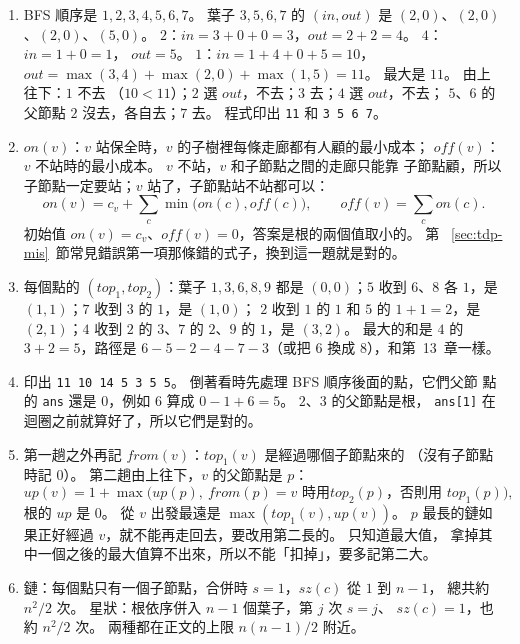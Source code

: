 \begin{enumerate}
\item BFS 順序是 $1, 2, 3, 4, 5, 6, 7$。 葉子 $3, 5, 6, 7$ 的 $(\mathit{in},
\mathit{out})$ 是 $(2, 0)$、$(2, 0)$、$(2, 0)$、$(5, 0)$。 $2$：$\mathit{in} = 3
+ 0 + 0 = 3$，$\mathit{out} = 2 + 2 = 4$。 $4$：$\mathit{in} = 1 + 0 = 1$，
$\mathit{out} = 5$。 $1$：$\mathit{in} = 1 + 4 + 0 + 5 = 10$，$\mathit{out} =
\max(3, 4) + \max(2, 0) + \max(1, 5) = 11$。 最大是 $11$。 由上往下：$1$ 不去
（$10 < 11$）；$2$ 選 $\mathit{out}$，不去；$3$ 去；$4$ 選 $\mathit{out}$，不去；
$5$、$6$ 的父節點 $2$ 沒去，各自去；$7$ 去。 程式印出 \texttt{11} 和
\texttt{3 5 6 7}。

\item $\mathit{on}(v)$：$v$ 站保全時，$v$ 的子樹裡每條走廊都有人顧的最小成本；
$\mathit{off}(v)$：$v$ 不站時的最小成本。 $v$ 不站，$v$ 和子節點之間的走廊只能靠
子節點顧，所以子節點一定要站；$v$ 站了，子節點站不站都可以：
\[
\mathit{on}(v) = c_v + \sum_c \min\bigl(\mathit{on}(c), \mathit{off}(c)\bigr),\qquad
\mathit{off}(v) = \sum_c \mathit{on}(c).
\]
初始值 $\mathit{on}(v) = c_v$、$\mathit{off}(v) = 0$，答案是根的兩個值取小的。 第
~\ref{sec:tdp-mis}~節常見錯誤第一項那條錯的式子，換到這一題就是對的。

\item 每個點的 $(\mathit{top}_1, \mathit{top}_2)$：葉子 $1, 3, 6, 8, 9$ 都是
$(0, 0)$；$5$ 收到 $6$、$8$ 各 $1$，是 $(1, 1)$；$7$ 收到 $3$ 的 $1$，是 $(1, 0)$；
$2$ 收到 $1$ 的 $1$ 和 $5$ 的 $1 + 1 = 2$，是 $(2, 1)$；$4$ 收到 $2$ 的 $3$、$7$
的 $2$、$9$ 的 $1$，是 $(3, 2)$。 最大的和是 $4$ 的 $3 + 2 = 5$，路徑是 $6 - 5 - 2
- 4 - 7 - 3$（或把 $6$ 換成 $8$），和第~13~章一樣。

\item 印出 \texttt{11 10 14 5 3 5 5}。 倒著看時先處理 BFS 順序後面的點，它們父節
點的 \texttt{ans} 還是 $0$，例如 $6$ 算成 $0 - 1 + 6 = 5$。 $2$、$3$ 的父節點是根，
\texttt{ans[1]} 在迴圈之前就算好了，所以它們是對的。

\item 第一趟之外再記 $\mathit{from}(v)$：$\mathit{top}_1(v)$ 是經過哪個子節點來的
（沒有子節點時記 $0$）。 第二趟由上往下，$v$ 的父節點是 $p$：
\[
\mathit{up}(v) = 1 + \max\bigl(\mathit{up}(p),\ \text{$\mathit{from}(p) = v$ 時用
$\mathit{top}_2(p)$，否則用 $\mathit{top}_1(p)$}\bigr),
\]
根的 $\mathit{up}$ 是 $0$。 從 $v$ 出發最遠是 $\max(\mathit{top}_1(v),
\mathit{up}(v))$。 $p$ 最長的鏈如果正好經過 $v$，就不能再走回去，要改用第二長的。 只知道最大值，
拿掉其中一個之後的最大值算不出來，所以不能「扣掉」，要多記第二大。

\item 鏈：每個點只有一個子節點，合併時 $s = 1$，$\mathit{sz}(c)$ 從 $1$ 到 $n - 1$，
總共約 $n^2 / 2$ 次。 星狀：根依序併入 $n - 1$ 個葉子，第 $j$ 次 $s = j$、
$\mathit{sz}(c) = 1$，也約 $n^2 / 2$ 次。 兩種都在正文的上限 $n(n-1)/2$ 附近。
\end{enumerate}
